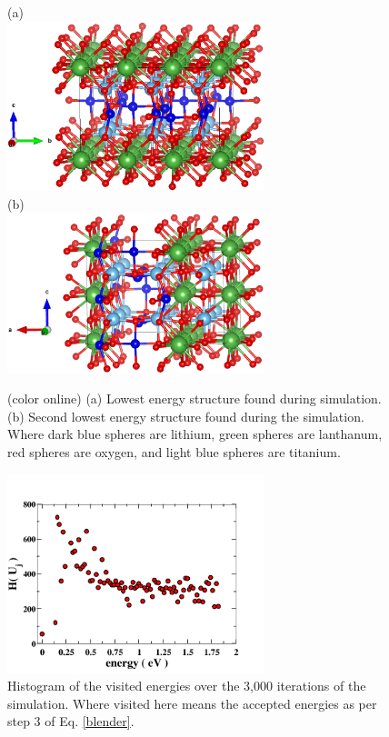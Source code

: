 \documentclass[aps,pre,reprint,superscriptaddress,showkeys]{revtex4-1}
\begin{document}
\begin{figure}
(a)\\
\includegraphics[width=7.5cm]{./figures/it326_run6_lowest_en.eps}\\
(b)\\
\includegraphics[width=7.5cm]{./figures/it1575_run1_second_lowest_en.eps}
\caption{(color online) (a) Lowest energy structure found during simulation. (b) Second lowest energy structure found during the simulation. Where dark blue spheres are lithium, green spheres are lanthanum, red spheres are oxygen, and light blue spheres  are titanium. \label{lowen_structures}}
\end{figure}

\begin{figure}
\includegraphics[width=7.5cm]{./figures/Htot.png}
\caption{Histogram of the visited energies over the 3,000 iterations of the simulation. Where visited here means the accepted energies as per step 3 of Eq. \ref{blender}.\label{Htot}}
\end{figure}
\end{document}
